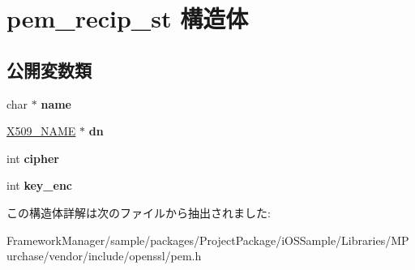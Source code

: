 \hypertarget{structpem__recip__st}{}\section{pem\+\_\+recip\+\_\+st 構造体}
\label{structpem__recip__st}
\subsection*{公開変数類}
\begin{DoxyCompactItemize}
\item 
\hypertarget{structpem__recip__st_a01cd4e55a392b7bc9c91f543800a7347}{}char $\ast$ {\bfseries name}\label{structpem__recip__st_a01cd4e55a392b7bc9c91f543800a7347}

\item 
\hypertarget{structpem__recip__st_a7087e450cc6060c055c430535b0df70e}{}\hyperlink{struct_x509__name__st}{X509\+\_\+\+N\+A\+M\+E} $\ast$ {\bfseries dn}\label{structpem__recip__st_a7087e450cc6060c055c430535b0df70e}

\item 
\hypertarget{structpem__recip__st_aacc99505c76644287f2b94c986349f16}{}int {\bfseries cipher}\label{structpem__recip__st_aacc99505c76644287f2b94c986349f16}

\item 
\hypertarget{structpem__recip__st_a10d41030c038defd986f740d1663b831}{}int {\bfseries key\+\_\+enc}\label{structpem__recip__st_a10d41030c038defd986f740d1663b831}

\end{DoxyCompactItemize}


この構造体詳解は次のファイルから抽出されました\+:\begin{DoxyCompactItemize}
\item 
Framework\+Manager/sample/packages/\+Project\+Package/i\+O\+S\+Sample/\+Libraries/\+M\+Purchase/vendor/include/openssl/pem.\+h\end{DoxyCompactItemize}
